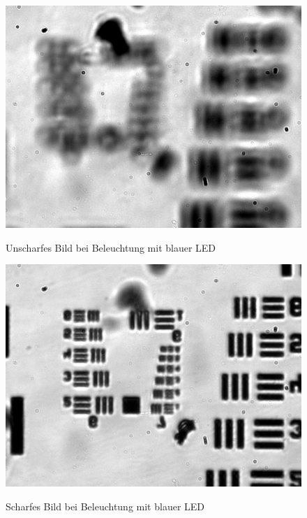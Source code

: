 \documentclass[english, ngerman]{scrartcl}
\begin{document}
\begin{figure}[H]
    \centering
    \begin{minipage}[t]{0.475\linewidth}
        \centering
        \includegraphics[width=\linewidth]{fig/Versuch3/hellfeld_3.3_blau_unscharf.jpg}
        \caption[Hellfeld LED blau unscharf]{Unscharfes Bild bei Beleuchtung mit blauer LED}
        \label{fig:Hellfeld_3_3_blau_unscharf}
        \includegraphics[width=\linewidth]{fig/Versuch3/hellfeld_3.3_blau_scharf.jpg}
        \caption[Hellfeld LED blau scharf]{Scharfes Bild bei Beleuchtung mit blauer LED}
        \label{fig:Hellfeld_3_3_blau_scharf}
    \end{minipage}%
    \hspace*{\fill}

\end{figure}
\end{document}
